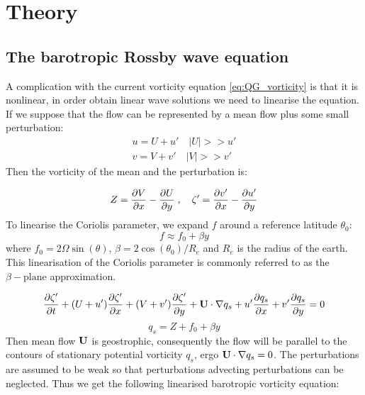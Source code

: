 \section{Theory}
\subsection{The barotropic Rossby wave equation}
A complication with the current vorticity equation \cref{eq:QG_vorticity} is
that it is nonlinear, in order obtain linear wave solutions we need to linearise
the equation. If we suppose that the flow can be represented by a
mean flow plus some small perturbation: 
\begin{equation}\label{eq:VeloctiyPertubation}
    \begin{split}
    u = U + u' \quad  |U| >> u' \\
    v = V + v' \quad  |V| >> v'
    \end{split}
\end{equation}
Then the vorticity of the mean and the perturbation is: 

\begin{equation}\label{eq:VortPertubation}
    Z = \pdv{V}{x} - \pdv{U}{y} \; , \quad \zeta' = \pdv{v'}{x} - \pdv{u'}{y} 
\end{equation}
To linearise the Coriolis parameter, we expand $f$
around a reference latitude $\theta_0$: 
\begin{equation}
    f \approx f_0 + \beta y
\end{equation} 
where $f_0 = 2\Omega \sin(\theta)$, $\beta = 2\cos (\theta_0)/R_e$ and $R_e$ is
the radius of the earth. This linearisation of the Coriolis parameter is
commonly referred to as the $\beta-\mathrm{plane}$ approximation.

\begin{equation}
    \pdv{\zeta'}{t} + (U+u')\pdv{\zeta'}{x} + (V+v')\pdv{\zeta'}{y} + \mathbf{U} 
    \cdot \nabla q_s + u' \pdv{q_s}{x} + v' \pdv{q_s}{y} = 0     
\end{equation}
\begin{equation}\label{eq:q_s}
    q_s = Z + f_0 + \beta y
\end{equation}
Then mean flow $\mathbf{U}$ is geostrophic, consequently the flow will be parallel
to the contours of stationary potential vorticity $q_s$, ergo $\mathbf{U} \cdot
\nabla q_s = 0$. The perturbations are assumed to be weak so that perturbations
advecting perturbations can be neglected. Thus we get the following linearised
barotropic vorticity equation:

